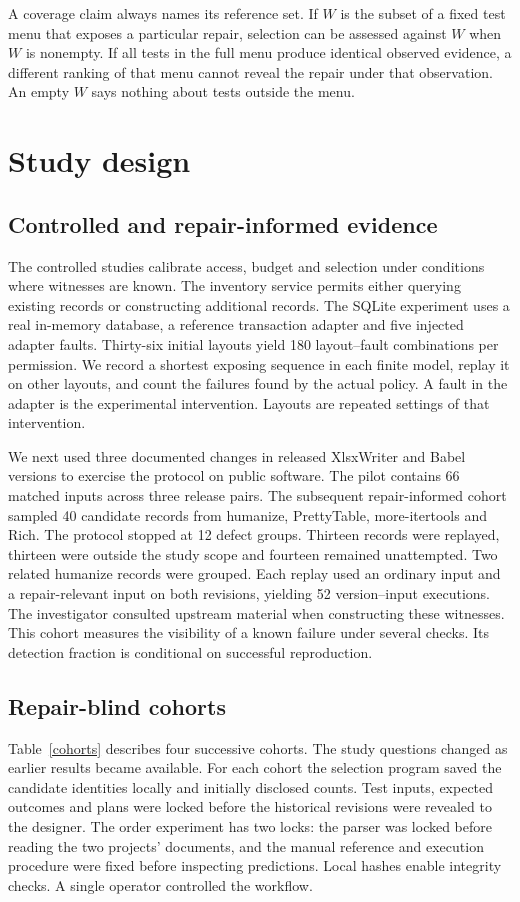 \documentclass[conference]{IEEEtran}
\begin{document}
A coverage claim always names its reference set. If $W$ is the subset of a fixed test menu that exposes a particular repair, selection can be assessed against $W$ when $W$ is nonempty. If all tests in the full menu produce identical observed evidence, a different ranking of that menu cannot reveal the repair under that observation. An empty $W$ says nothing about tests outside the menu.

\section{Study design}
\subsection{Controlled and repair-informed evidence}
The controlled studies calibrate access, budget and selection under conditions where witnesses are known. The inventory service permits either querying existing records or constructing additional records. The SQLite experiment uses a real in-memory database, a reference transaction adapter and five injected adapter faults. Thirty-six initial layouts yield 180 layout--fault combinations per permission. We record a shortest exposing sequence in each finite model, replay it on other layouts, and count the failures found by the actual policy. A fault in the adapter is the experimental intervention. Layouts are repeated settings of that intervention.

We next used three documented changes in released XlsxWriter and Babel versions to exercise the protocol on public software. The pilot contains 66 matched inputs across three release pairs. The subsequent repair-informed cohort sampled 40 candidate records from humanize, PrettyTable, more-itertools and Rich. The protocol stopped at 12 defect groups. Thirteen records were replayed, thirteen were outside the study scope and fourteen remained unattempted. Two related humanize records were grouped. Each replay used an ordinary input and a repair-relevant input on both revisions, yielding 52 version--input executions. The investigator consulted upstream material when constructing these witnesses. This cohort measures the visibility of a known failure under several checks. Its detection fraction is conditional on successful reproduction.

\subsection{Repair-blind cohorts}
Table~\ref{cohorts} describes four successive cohorts. The study questions changed as earlier results became available. For each cohort the selection program saved the candidate identities locally and initially disclosed counts. Test inputs, expected outcomes and plans were locked before the historical revisions were revealed to the designer. The order experiment has two locks: the parser was locked before reading the two projects' documents, and the manual reference and execution procedure were fixed before inspecting predictions. Local hashes enable integrity checks. A single operator controlled the workflow.
\end{document}
